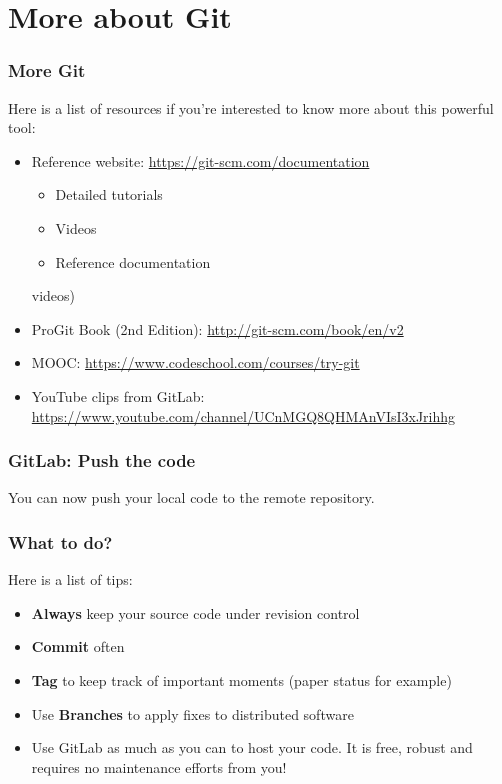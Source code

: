 
\section{More about Git}

\begin{frame}
  \frametitle{More Git}

  Here is a list of resources if you're interested to know more about this
  powerful tool:

  \vspace{2em}

  \begin{itemize}
    \item Reference website: \url{https://git-scm.com/documentation}
      \begin{itemize}
        \item Detailed tutorials
        \item Videos
        \item Reference documentation
      \end{itemize}
      videos)
    \item ProGit Book (2nd Edition): \url{http://git-scm.com/book/en/v2}
    \item MOOC: \url{https://www.codeschool.com/courses/try-git}
    \item YouTube clips from GitLab: \url{https://www.youtube.com/channel/UCnMGQ8QHMAnVIsI3xJrihhg}
  \end{itemize}
\end{frame}

\begin{frame}
  \frametitle{GitLab: Push the code}

  You can now push your local code to the remote repository.

\end{frame}



\begin{frame}
  \frametitle{What to do?}

  Here is a list of tips:

  \vspace{2em}

  \begin{itemize}
    \item \textbf{Always} keep your source code under revision control
    \item \textbf{Commit} often
    \item \textbf{Tag} to keep track of important moments (paper status for example)
    \item Use \textbf{Branches} to apply fixes to distributed software
    \item Use GitLab as much as you can to host your code. It is free, robust and requires no maintenance efforts from you!
  \end{itemize}

\end{frame}
